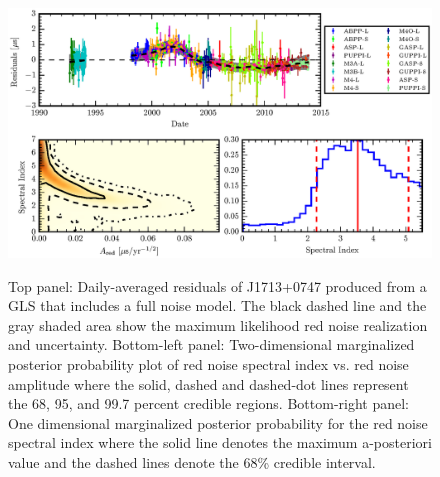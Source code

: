 \documentclass[12pt,preprint]{aastex}
\begin{document}
\begin{figure}
\includegraphics[scale=1.0]{fig3.eps} \\ 
\caption{\label{fig:res} Top panel: Daily-averaged residuals of J1713+0747 produced from a GLS that includes a 
full noise model. The black dashed line and the gray shaded area show the maximum likelihood red noise
realization and uncertainty. Bottom-left panel: Two-dimensional marginalized posterior probability plot of red
noise spectral index vs. red noise amplitude where the solid, dashed and dashed-dot lines represent the 68, 95, and 99.7 percent credible regions. Bottom-right panel: One dimensional marginalized posterior probability for the red noise spectral index where the solid line denotes the maximum a-posteriori value and the dashed lines denote the 68\% credible interval.}
\end{figure} 
\end{document}
